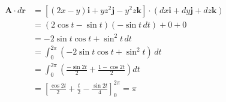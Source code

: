 \documentclass[10pt]{beamer}
\begin{document}
\begin{frame}
\[
\begin{aligned}
\mathbf{A} \cdot d\mathbf{r} &= [(2x - y)\mathbf{i} + yz^2\mathbf{j} - y^2z\mathbf{k}] \cdot (dx \mathbf{i} + dy \mathbf{j} + dz \mathbf{k}) \\
&= (2\cos t - \sin t) (-\sin t \, dt) + 0 + 0 \\
&= -2 \sin t \cos t + \sin^2 t \, dt \\
&= \int_0^{2\pi} (-2 \sin t \cos t + \sin^2 t) \, dt \\
&= \int_0^{2\pi} \left( \frac{- \sin 2t}{2} + \frac{1 - \cos 2t}{2} \right) dt \\
&= \left[ \frac{\cos 2t}{2} + \frac{t}{2} - \frac{\sin 2t}{4} \right]_0^{2\pi} = \pi
\end{aligned}
\]
\end{frame}
\end{document}
